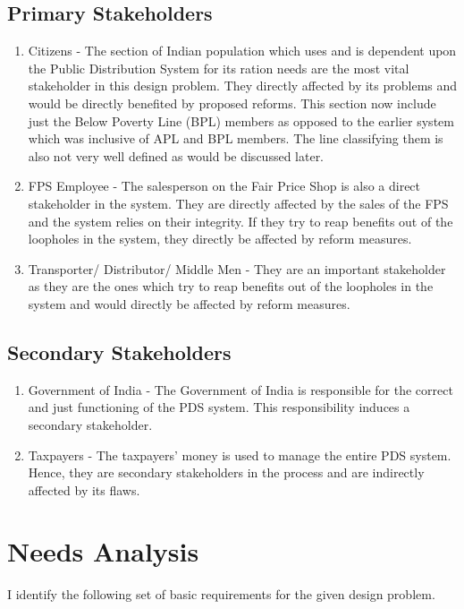 \documentclass{article}
\begin{document}
\subsection{Primary Stakeholders}

\begin{enumerate}  
\item Citizens - The section of Indian population which uses and is dependent upon the Public Distribution System for its ration needs are the most vital stakeholder in this design problem. They directly affected by its problems and would be directly benefited by proposed reforms. This section now include just the Below Poverty Line (BPL) members as opposed to the earlier system which was inclusive of APL and BPL members. The line classifying them is also not very well defined as would be discussed later.
\item FPS Employee - The salesperson on the Fair Price Shop is also a direct stakeholder in the system. They are directly affected by the sales of the FPS and the system relies on their integrity. If they try to reap benefits out of the loopholes in the system, they directly be affected by reform measures.
\item Transporter/ Distributor/ Middle Men - They are an important stakeholder as they are the ones which try to reap benefits out of the loopholes in the system and would directly be affected by reform measures.
\end{enumerate}

\subsection{Secondary Stakeholders}

\begin{enumerate}  
\item Government of India - The Government of India is responsible for the correct and just functioning of the PDS system. This responsibility induces a secondary stakeholder.
\item Taxpayers - The taxpayers' money is used to manage the entire PDS system. Hence, they are secondary stakeholders in the process and are indirectly affected by its flaws.
\end{enumerate}


\section{Needs Analysis}

I identify the following set of basic requirements for the given design problem.
\end{document}

